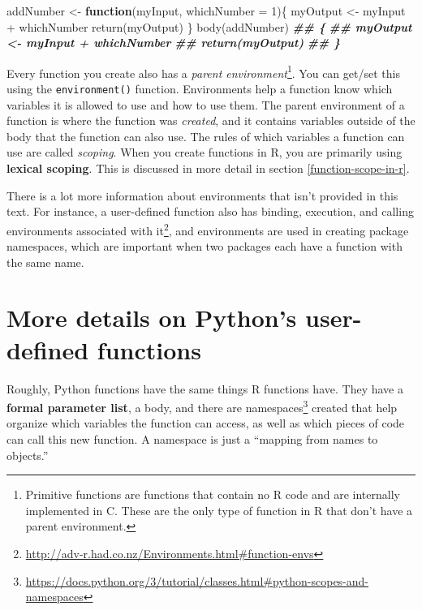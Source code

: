 \documentclass[
  12pt,
  krantz2]{krantz}
\makeatletter
\newenvironment{Shaded}{\begin{snugshade}}{\end{snugshade}}
\newcommand{\AttributeTok}[1]{\textcolor[rgb]{0.61,0.61,0.61}{#1}}
\newcommand{\ControlFlowTok}[1]{\textcolor[rgb]{0.27,0.27,0.27}{\textbf{#1}}}
\newcommand{\DecValTok}[1]{\textcolor[rgb]{0.06,0.06,0.06}{#1}}
\newcommand{\DocumentationTok}[1]{\textcolor[rgb]{0.37,0.37,0.37}{\textbf{\textit{#1}}}}
\newcommand{\FunctionTok}[1]{\textcolor[rgb]{0,0,0}{#1}}
\newcommand{\NormalTok}[1]{#1}
\newcommand{\OtherTok}[1]{\textcolor[rgb]{0.37,0.37,0.37}{#1}}
\newcommand{\SpecialCharTok}[1]{\textcolor[rgb]{0,0,0}{#1}}
\renewcommand{\href}[2]{#2\footnote{\url{#1}}}
\newenvironment{kframe}{%
\medskip{}
\setlength{\fboxsep}{.8em}
 \def\at@end@of@kframe{}%
 \ifinner\ifhmode%
  \def\at@end@of@kframe{\end{minipage}}%
  \begin{minipage}{\columnwidth}%
 \fi\fi%
 \def\FrameCommand##1{\hskip\@totalleftmargin \hskip-\fboxsep
 \colorbox{shadecolor}{##1}\hskip-\fboxsep
     \hskip-\linewidth \hskip-\@totalleftmargin \hskip\columnwidth}%
 \MakeFramed {\advance\hsize-\width
   \@totalleftmargin\z@ \linewidth\hsize
   \@setminipage}}%
 {\par\unskip\endMakeFramed%
 \at@end@of@kframe}
\renewenvironment{Shaded}{\begin{kframe}}{\end{kframe}}
\makeatother
\begin{document}
\begin{Shaded}
\begin{Highlighting}[]
\NormalTok{addNumber }\OtherTok{\textless{}{-}} \ControlFlowTok{function}\NormalTok{(myInput, }\AttributeTok{whichNumber =} \DecValTok{1}\NormalTok{)\{  }
\NormalTok{  myOutput }\OtherTok{\textless{}{-}}\NormalTok{ myInput }\SpecialCharTok{+}\NormalTok{ whichNumber}
  \FunctionTok{return}\NormalTok{(myOutput)}
\NormalTok{\}}
\FunctionTok{body}\NormalTok{(addNumber)}
\DocumentationTok{\#\# \{}
\DocumentationTok{\#\#     myOutput \textless{}{-} myInput + whichNumber}
\DocumentationTok{\#\#     return(myOutput)}
\DocumentationTok{\#\# \}}
\end{Highlighting}
\end{Shaded}

Every function you create also has a \emph{parent environment}\footnote{Primitive functions are functions that contain no R code and are internally implemented in C. These are the only type of function in R that don't have a parent environment.}. You can get/set this using the \texttt{environment()} function. Environments help a function know which variables it is allowed to use and how to use them. The parent environment of a function is where the function was \emph{created}, and it contains variables outside of the body that the function can also use. The rules of which variables a function can use are called \emph{scoping}. When you create functions in R, you are primarily using \textbf{lexical scoping}. This is discussed in more detail in section \ref{function-scope-in-r}.

There is a lot more information about environments that isn't provided in this text. For instance, a user-defined function also has \href{http://adv-r.had.co.nz/Environments.html\#function-envs}{binding, execution, and calling environments associated with it}, and environments are used in creating package namespaces, which are important when two packages each have a function with the same name.

\hypertarget{more-details-on-pythons-user-defined-functions}{%
\section{More details on Python's user-defined functions}\label{more-details-on-pythons-user-defined-functions}}

Roughly, Python functions have the same things R functions have. They have a \textbf{formal parameter list}, a body, and there are \href{https://docs.python.org/3/tutorial/classes.html\#python-scopes-and-namespaces}{namespaces} created that help organize which variables the function can access, as well as which pieces of code can call this new function. A namespace is just a ``mapping from names to objects.''
\end{document}
